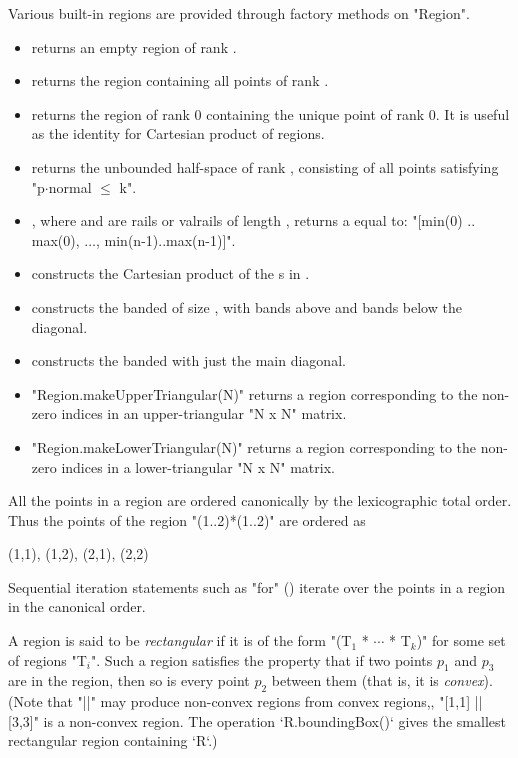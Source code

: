 Various built-in regions are provided through  factory
methods on \xcd"Region".  
\begin{itemize}
\item {} returns an empty region of rank .
\item {} returns the region containing all points of
      rank .  
\item {} returns the region of rank 0 containing the
      unique point of rank 0.  It is useful as the identity for Cartesian
      product of regions.
\item {} returns the unbounded
      half-space of rank , consisting of all points 
      satisfying \xcdmath"p$\cdot$normal $\le$ k".
\item {}, where  and 
      are  rails or valrails of length , returns a
       equal to: 
      \xcdmath"[min(0) .. max(0), $\ldots$, min(n-1)..max(n-1)]".
\item {} constructs the Cartesian product of the
      s in .
\item {} constructs the
      banded  of size , with  bands above
      and  bands below the diagonal.
\item {} constructs the banded  with
      just the main diagonal.
\item \xcd"Region.makeUpperTriangular(N)" returns a region corresponding
to the non-zero indices in an upper-triangular \xcd"N x N" matrix.
\item \xcd"Region.makeLowerTriangular(N)" returns a region corresponding
to the non-zero indices in a lower-triangular \xcd"N x N" matrix.
\end{itemize}

All the points in a region are ordered canonically by the
lexicographic total order. Thus the points of the region \xcd"(1..2)*(1..2)"
are ordered as 
\begin{xten}
(1,1), (1,2), (2,1), (2,2)
\end{xten}
Sequential iteration statements such as \xcd"for" ()
iterate over the points in a region in the canonical order.

A region is said to be {\em rectangular} if it is of
the form \xcdmath"(T$_1$ * $\cdots$ * T$_k$)" for some set of regions
\xcdmath"T$_i$". Such a
region satisfies the property that if two points $p_1$ and $p_3$ are
in the region, then so is every point $p_2$ between them (that is, it is {\em convex}). 
(Note that \xcd"||" may produce non-convex regions from convex regions,\eg,
\xcd"[1,1] || [3,3]" is a non-convex region.  The operation
\xcd`R.boundingBox()` gives the smallest rectangular region containing
\xcd`R`.)  

